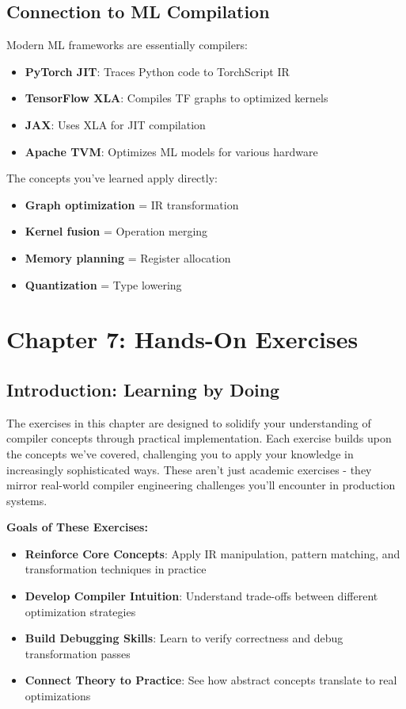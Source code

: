 \documentclass[11pt,a4paper]{article}
\begin{document}
\subsection{Connection to ML Compilation}

Modern ML frameworks are essentially compilers:

\begin{itemize}
    \item \textbf{PyTorch JIT}: Traces Python code to TorchScript IR
    \item \textbf{TensorFlow XLA}: Compiles TF graphs to optimized kernels
    \item \textbf{JAX}: Uses XLA for JIT compilation
    \item \textbf{Apache TVM}: Optimizes ML models for various hardware
\end{itemize}

The concepts you've learned apply directly:
\begin{itemize}
    \item \textbf{Graph optimization} = IR transformation
    \item \textbf{Kernel fusion} = Operation merging
    \item \textbf{Memory planning} = Register allocation
    \item \textbf{Quantization} = Type lowering
\end{itemize}

\section{Chapter 7: Hands-On Exercises}

\subsection{Introduction: Learning by Doing}

The exercises in this chapter are designed to solidify your understanding of compiler concepts through practical implementation. Each exercise builds upon the concepts we've covered, challenging you to apply your knowledge in increasingly sophisticated ways. These aren't just academic exercises - they mirror real-world compiler engineering challenges you'll encounter in production systems.

\textbf{Goals of These Exercises:}
\begin{itemize}
    \item \textbf{Reinforce Core Concepts}: Apply IR manipulation, pattern matching, and transformation techniques in practice
    \item \textbf{Develop Compiler Intuition}: Understand trade-offs between different optimization strategies
    \item \textbf{Build Debugging Skills}: Learn to verify correctness and debug transformation passes
    \item \textbf{Connect Theory to Practice}: See how abstract concepts translate to real optimizations
\end{itemize}
\end{document}
